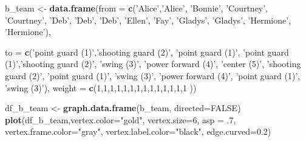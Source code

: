 \documentclass[]{article}
\newenvironment{Shaded}{\begin{snugshade}}{\end{snugshade}}
\newcommand{\KeywordTok}[1]{\textcolor[rgb]{0.13,0.29,0.53}{\textbf{{#1}}}}
\newcommand{\DataTypeTok}[1]{\textcolor[rgb]{0.13,0.29,0.53}{{#1}}}
\newcommand{\DecValTok}[1]{\textcolor[rgb]{0.00,0.00,0.81}{{#1}}}
\newcommand{\FloatTok}[1]{\textcolor[rgb]{0.00,0.00,0.81}{{#1}}}
\newcommand{\StringTok}[1]{\textcolor[rgb]{0.31,0.60,0.02}{{#1}}}
\newcommand{\OtherTok}[1]{\textcolor[rgb]{0.56,0.35,0.01}{{#1}}}
\newcommand{\NormalTok}[1]{{#1}}
\begin{document}
\begin{Shaded}
\begin{Highlighting}[]
\NormalTok{b_team <-}\StringTok{ }\KeywordTok{data.frame}\NormalTok{(}\DataTypeTok{from =} \KeywordTok{c}\NormalTok{(}\StringTok{'Alice'}\NormalTok{,}\StringTok{'Alice'}\NormalTok{,}
                                 \StringTok{'Bonnie'}\NormalTok{, }
                                 \StringTok{'Courtney'}\NormalTok{, }\StringTok{'Courtney'}\NormalTok{, }
                                 \StringTok{'Deb'}\NormalTok{,  }\StringTok{'Deb'}\NormalTok{,  }\StringTok{'Deb'}\NormalTok{,}
                                 \StringTok{'Ellen'}\NormalTok{, }
                                 \StringTok{'Fay'}\NormalTok{,}
                                 \StringTok{'Gladys'}\NormalTok{, }\StringTok{'Gladys'}\NormalTok{,}
                                 \StringTok{'Hermione'}\NormalTok{, }\StringTok{'Hermione'}\NormalTok{),}
                        
                        \DataTypeTok{to =} \KeywordTok{c}\NormalTok{(}\StringTok{'point guard (1)'}\NormalTok{,}\StringTok{'shooting guard (2)'}\NormalTok{,}
                               \StringTok{'point guard (1)'}\NormalTok{,}
                               \StringTok{'point guard (1)'}\NormalTok{,}\StringTok{'shooting guard (2)'}\NormalTok{,}
                               \StringTok{'swing (3)'}\NormalTok{, }\StringTok{'power forward (4)'}\NormalTok{, }\StringTok{'center (5)'}\NormalTok{,}
                               \StringTok{'shooting guard (2)'}\NormalTok{,}
                               \StringTok{'point guard (1)'}\NormalTok{,}
                               \StringTok{'swing (3)'}\NormalTok{, }\StringTok{'power forward (4)'}\NormalTok{,}
                               \StringTok{'point guard (1)'}\NormalTok{, }\StringTok{'swing (3)'}\NormalTok{),}
                        \DataTypeTok{weight =} \KeywordTok{c}\NormalTok{(}\DecValTok{1}\NormalTok{,}\DecValTok{1}\NormalTok{,}\DecValTok{1}\NormalTok{,}\DecValTok{1}\NormalTok{,}\DecValTok{1}\NormalTok{,}\DecValTok{1}\NormalTok{,}\DecValTok{1}\NormalTok{,}\DecValTok{1}\NormalTok{,}\DecValTok{1}\NormalTok{,}\DecValTok{1}\NormalTok{,}\DecValTok{1}\NormalTok{,}\DecValTok{1}\NormalTok{,}\DecValTok{1}\NormalTok{,}\DecValTok{1} \NormalTok{))}

\NormalTok{df_b_team <-}\StringTok{ }\KeywordTok{graph.data.frame}\NormalTok{(b_team, }\DataTypeTok{directed=}\OtherTok{FALSE}\NormalTok{)}
\KeywordTok{plot}\NormalTok{(df_b_team,}\DataTypeTok{vertex.color=}\StringTok{"gold"}\NormalTok{, }
     \DataTypeTok{vertex.size=}\DecValTok{6}\NormalTok{, }
     \DataTypeTok{asp =} \NormalTok{.}\DecValTok{7}\NormalTok{,}
     \DataTypeTok{vertex.frame.color=}\StringTok{"gray"}\NormalTok{, }
     \DataTypeTok{vertex.label.color=}\StringTok{"black"}\NormalTok{,  }
     \DataTypeTok{edge.curved=}\FloatTok{0.2}\NormalTok{)}
\end{Highlighting}
\end{Shaded}
\end{document}
